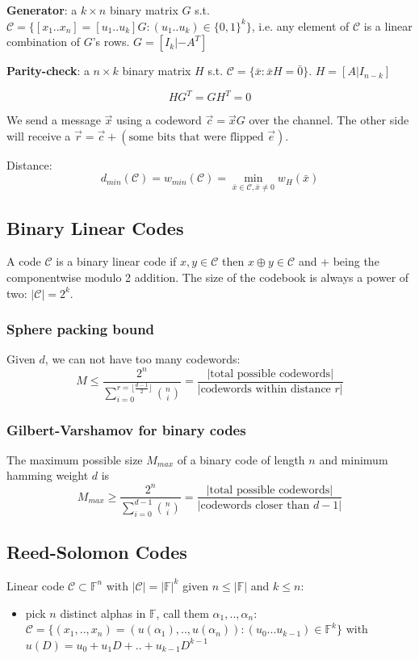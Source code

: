\documentclass[10pt,a4paper,landscape]{article}
\begin{document}
\begin{multicols*}{4}
\textbf{Generator}: a $k \times n$ binary matrix $G$ s.t. $\mathcal{C} = \{[x_1..x_n] = [u_1..u_k]G: (u_1..u_k) \in \{0,1\}^k\}$, i.e. any element of $\mathcal{C}$ is a linear combination of $G$'s rows.
$G = [I_k | - A^T]$

\textbf{Parity-check}: a $n \times k$ binary matrix $H$ s.t. $\mathcal{C} = \{\bar{x}: \bar{x}H = \bar{0}\}$. $H = [A | I_{n-k}]$

$$H G^T = G H^T = 0$$

We send a message $\vec x$ using a codeword $\vec c = \vec x G$ over the channel. The other side will receive a $\vec r = \vec c + (\text{some bits that were flipped } \vec e)$.

Distance: $$d_{min}(\mathcal{C}) = w_{min}(\mathcal{C}) = \min_{\bar{x}\in\mathcal{C}, \bar{x}\neq 0} w_H (\bar{x})$$

\subsection{Binary Linear Codes}
A code $\mathcal{C}$ is a binary linear code if $x,y \in \mathcal{C}$ then $x \oplus y \in \mathcal{C}$ and + being the componentwise modulo 2 addition. The size of the codebook is always a power of two: $|\mathcal{C}| = 2^k$.

\subsubsection{Sphere packing bound}
Given $d$, we can not have too many codewords:
$$M \leq \frac{2^n}{\sum_{i=0}^{r = \lfloor \frac{d-1}{2} \rfloor} {n \choose i}} = \frac{|\text{total possible codewords}|}{|\text{codewords within distance $r$}|}$$

\subsubsection{Gilbert-Varshamov for binary codes}
The maximum possible size $M_{max}$ of a binary code of length $n$ and minimum hamming weight $d$ is
$$M_{max} \geq \frac{2^n}{\sum_{i=0}^{d-1} {n \choose i}} = \frac{|\text{total possible codewords}|}{|\text{codewords closer than $d-1$}|}$$

\subsection{Reed-Solomon Codes}
Linear code $\mathcal{C} \subset \mathbb{F}^n$ with $|\mathcal{C}| = |\mathbb{F}|^k$ given $n \leq |\mathbb{F}|$ and $k \leq n$:
\begin{itemize}
 \item pick $n$ distinct alphas in $\mathbb{F}$, call them $\alpha_1 , .., \alpha_n$:
 $\mathcal{C} = \{(x_1,..,x_n) = \left( u(\alpha_1),..,u(\alpha_n)\right) : (u_0 ... u_{k-1}) \in \mathbb{F}^k\}$ with $u(D) = u_0 + u_1D + .. + u_{k-1}D^{k-1}$
\end{itemize}


\end{multicols*}
\end{document}
